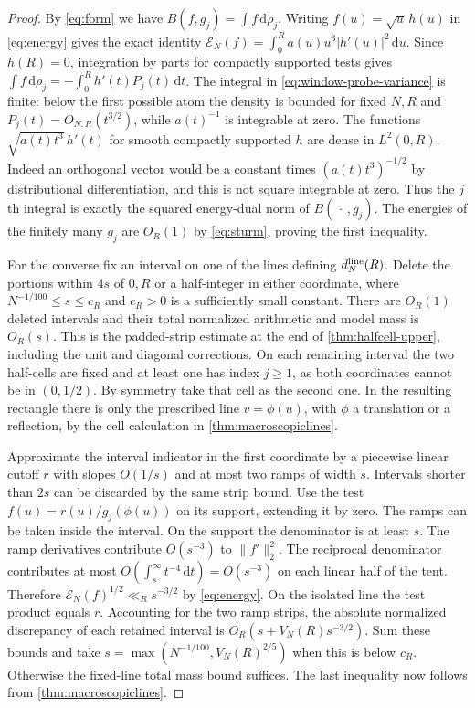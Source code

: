 \documentclass[11pt,a4paper]{article}
\numberwithin{equation}{section}
\newcommand{\ud}{\mathrm d}
\newcommand{\E}{\mathcal E_N}
\begin{document}
\begin{proof}
By \cref{eq:form} we have $B(f,g_j)=\int f\,\ud\rho_j$.
Writing $f(u)=\sqrt u\,h(u)$ in \cref{eq:energy} gives the
exact identity $\E(f)=\int_0^R a(u)u^3|h'(u)|^2\,\ud u$.
Since $h(R)=0$, integration by parts for compactly supported
tests gives $\int f\,\ud\rho_j=-\int_0^R h'(t)P_j(t)\,\ud t$.
The integral in \cref{eq:window-probe-variance} is finite:
below the first possible atom the density is bounded for fixed
$N,R$ and $P_j(t)=O_{N,R}(t^{3/2})$, while $a(t)^{-1}$ is
integrable at zero. The functions $\sqrt{a(t)t^3}\,h'(t)$
for smooth compactly supported $h$ are dense in $L^2(0,R)$.
Indeed an orthogonal vector would be a constant times
$(a(t)t^3)^{-1/2}$ by distributional differentiation, and this
is not square integrable at zero. Thus the $j$th integral is
exactly the squared energy-dual norm of $B(\,\cdot\,,g_j)$.
The energies of the finitely many $g_j$ are $O_R(1)$ by
\cref{eq:sturm}, proving the first inequality.

For the converse fix an interval on one of the lines defining
$d_N^{\rm line}(R)$. Delete the portions within $4s$ of $0,R$
or a half-integer in either coordinate, where
$N^{-1/100}\le s\le c_R$ and $c_R>0$ is a sufficiently small
constant. There are $O_R(1)$ deleted intervals and their total
normalized arithmetic and model mass is $O_R(s)$. This is the
padded-strip estimate at the end of \cref{thm:halfcell-upper},
including the unit and diagonal corrections.
On each remaining interval the two half-cells are fixed and
at least one has index $j\ge1$, as both coordinates cannot be
in $(0,1/2)$. By symmetry take that cell as the second one.
In the resulting rectangle there is only the prescribed line
$v=\phi(u)$, with $\phi$ a translation or a reflection, by
the cell calculation in \cref{thm:macroscopiclines}.

Approximate the interval indicator in the first coordinate by
a piecewise linear cutoff $r$ with slopes $O(1/s)$ and at most
two ramps of width $s$. Intervals shorter than $2s$ can be
discarded by the same strip bound. Use the test
$f(u)=r(u)/g_j(\phi(u))$ on its support, extending it by zero.
The ramps can be taken inside the interval. On the support the
denominator is at least $s$. The ramp derivatives contribute
$O(s^{-3})$ to $\|f'\|_2^2$. The reciprocal denominator
contributes at most $O(\int_s^\infty t^{-4}\,\ud t)=O(s^{-3})$
on each linear half of the tent. Therefore
$\E(f)^{1/2}\ll_R s^{-3/2}$ by \cref{eq:energy}.
On the isolated line the test product equals $r$. Accounting
for the two ramp strips, the absolute normalized discrepancy of
each retained interval is $O_R(s+V_N(R)s^{-3/2})$. Sum these
bounds and take $s=\max(N^{-1/100},V_N(R)^{2/5})$ when this
is below $c_R$. Otherwise the fixed-line total mass bound suffices.
The last inequality now follows from \cref{thm:macroscopiclines}.
\end{proof}
\end{document}
